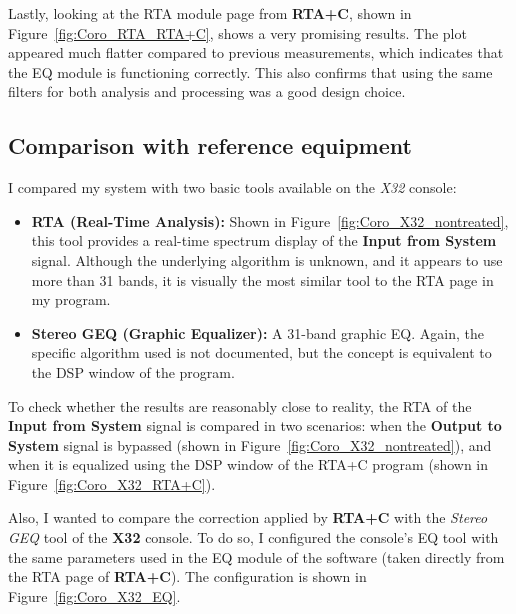 Lastly, looking at the RTA module page from \textbf{RTA+C}, shown in Figure~\ref{fig:Coro_RTA_RTA+C}, shows a very promising results. The plot appeared much flatter compared to previous measurements, which indicates that the EQ module is functioning correctly. This also confirms that using the same filters for both analysis and processing was a good design choice.

\subsection{Comparison with reference equipment}

I compared my system with two basic tools available on the \textit{X32} console:

\begin{itemize}
	\item \textbf{RTA (Real-Time Analysis):} Shown in Figure~\ref{fig:Coro_X32_nontreated}, this tool provides a real-time spectrum display of the \textbf{Input from System} signal. Although the underlying algorithm is unknown, and it appears to use more than 31 bands, it is visually the most similar tool to the RTA page in my program.
	\item \textbf{Stereo GEQ (Graphic Equalizer):} A 31-band graphic EQ. Again, the specific algorithm used is not documented, but the concept is equivalent to the DSP window of the program.
\end{itemize}

To check whether the results are reasonably close to reality, the RTA of the \textbf{Input from System} signal is compared in two scenarios: when the \textbf{Output to System} signal is bypassed (shown in Figure~\ref{fig:Coro_X32_nontreated}), and when it is equalized using the DSP window of the RTA+C program (shown in Figure~\ref{fig:Coro_X32_RTA+C}).

Also, I wanted to compare the correction applied by \textbf{RTA+C} with the \textit{Stereo GEQ} tool of the \textbf{X32} console. To do so, I configured the console's EQ tool with the same parameters used in the EQ module of the software (taken directly from the RTA page of \textbf{RTA+C}). The configuration is shown in Figure~\ref{fig:Coro_X32_EQ}.

